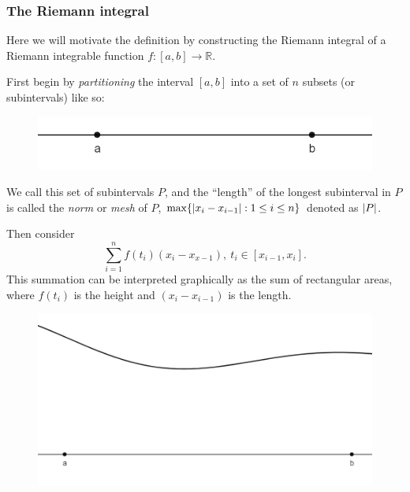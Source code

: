 \documentclass[mathserif]{beamer}
\newcommand{\sbr}[1]{\left[#1\right]}
\begin{document}
\begin{frame}
  \frametitle{The Riemann integral}

  Here we will motivate the definition by constructing the Riemann integral of a Riemann integrable function $f : \sbr{a,b} \to \mathbb{R}$. 

  First begin by \textit{partitioning} the interval $\sbr{a,b}$ into a set of $n$ subsets (or subintervals) like so:

  \begin{figure}[h]
    \centering
    \includegraphics[scale=0.75]{interval}
  \end{figure}

  We call this set of subintervals $P$, and the ``length'' of the longest subinterval in $P$ is called the \textit{norm} or \textit{mesh} of $P$, $\max\{\abs{x_i-x_{i-1}} : 1\leq i \leq n\}$ denoted as $\abs{P}$. 
\end{frame}

\begin{frame}
  Then consider $$\sum_{i=1}^n f(t_i)(x_i-x_{x-1}), ~ t_i\in\sbr{x_{i-1},x_i}.$$ This summation can be interpreted graphically as the sum of rectangular areas, where $f(t_i)$ is the height and $(x_i-x_{i-1})$ is the length.

  \begin{figure}[h]
    \centering
    \includegraphics[scale=0.4]{firstsum}
  \end{figure}

\end{frame}
\end{document}
